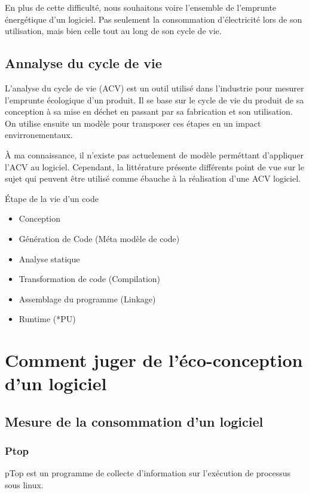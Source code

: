 \documentclass[a4paper, 11pt]{report}
\begin{document}
En plus de cette difficulté, nous souhaitons voire l'ensemble de l'emprunte énergétique d'un logiciel. Pas seulement la consommation d'électricité lors de son utilisation, mais bien celle tout au long de son cycle de vie.

\subsection{Annalyse du cycle de vie}
L'analyse du cycle de vie (ACV) est un outil utilisé dans l'industrie pour mesurer l'emprunte écologique d'un produit. Il se base sur le cycle de vie du produit de sa conception à sa mise en déchet en passant par sa fabrication et son utilisation. On utilise ensuite un modèle pour transposer ces étapes en un impact envirronementaux.

À ma connaissance, il n'existe pas actuelement de modèle perméttant d'appliquer l'ACV au logiciel. Cependant, la littérature présente différents point de vue sur le sujet qui peuvent être utilisé comme ébauche à la réalisation d'une ACV logiciel.

Étape de la vie d’un code
\begin{itemize}
	\item Conception
	\item Génération de Code (Méta modèle de code)
	\item Analyse statique
	\item Transformation de code (Compilation)
	\item Assemblage du programme (Linkage)
	\item Runtime (*PU)
\end{itemize}

\section{Comment juger de l'éco-conception d'un logiciel}

\subsection{Mesure de la consommation d'un logiciel}
\subsubsection{Ptop}
pTop est un programme de collecte d’information sur l'exécution de processus sous linux.
\end{document}

